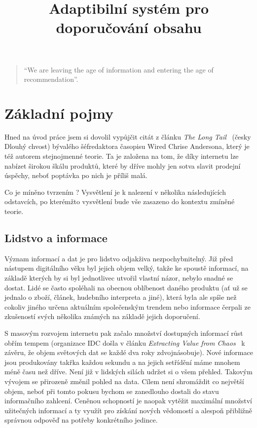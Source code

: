 \documentclass[thesis=M,czech]{FITthesis}[2014/05/07]
\title{Adaptibilní systém pro doporučování obsahu}
\begin{document}

\begin{introduction}
	\begin{quote}
		``We are leaving the age of information and entering the age of recommendation''.
	\end{quote}
	\section{Základní pojmy}	
	Hned na úvod práce jsem si dovolil vypůjčit citát z článku \emph{The Long Tail}~\cite{anderson} (česky Dlouhý chvost) bývalého šéfredaktora časopisu Wired Chrise Andersona, který je též autorem stejnojmenné teorie. Ta je založena na tom, že díky internetu lze nabízet širokou škálu produktů, které by dříve mohly jen sotva slavit prodejní úspěchy, neboť poptávka po nich je příliš malá. 
	
	Co je míněno tvrzením ? Vysvětlení je k nalezení v několika následujících odstavcích, po kterémžto vysvětlení bude vše zasazeno do kontextu zmíněné teorie.
	
	\subsection{Lidstvo a informace}	
	Význam informací a dat je pro lidstvo odjakživa nezpochybnitelný. Již před nástupem digitálního věku byl jejich objem velký, takže ke spoustě informací, na základě kterých by si byl jednotlivec utvořil vlastní názor, nebylo snadné se dostat. Lidé se často spoléhali na obecnou oblíbenost daného produktu (ať už se jednalo o zboží, článek, hudebního interpreta a jiné), která byla ale spíše než cokoliv jiného určena aktuálním společenským trendem nebo informace čerpali ze zkušeností svých několika známých na základě jejich doporučení.
	
	S masovým rozvojem internetu pak začalo množství dostupných informací růst obřím tempem (organizace IDC došla v článku \emph{Extracting Value from Chaos}~\cite{digitaluniverse} k závěru, že objem světových dat se každé dva roky zdvojnásobuje). Nové informace jsou produkovány takřka každou sekundu a na jejich setřídění máme mnohem méně času než dříve. Není již v lidských silách udržet si o všem přehled. Takovým vývojem se přirozeně změnil pohled na data. Cílem není shromáždit co největší objem, neboť při tomto pokusu bychom se zanedlouho dostali do stavu informačního zahlcení. Ceněnou schopností je naopak vytěžit maximální množství užitečných informací a ty využít pro získání nových vědomostí a alespoň přibližně správnou odpověď na potřeby konkrétního jedince.
	

\end{introduction}
\end{document}

